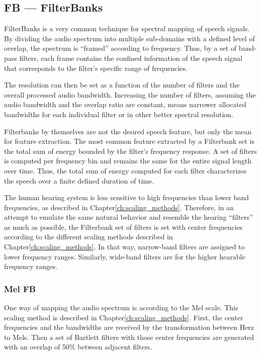 \subsection{FB --- FilterBanks}
FilterBanks is a very common technique
for spectral mapping of speech signals.
By dividing the audio spectrum into multiple 
sub-domains with a defined level of overlap, 
the spectrum is 
``framed'' according to frequency. 
Thus, by a set of band-pass filters,
each frame contains the confined 
information of the speech signal 
that corresponds to the filter's specific 
range of frequencies.

The resolution can then be set as a function of
the number of filters and the overall processed audio bandwidth.
Increasing the number of filters, assuming the 
audio bandwidth and the overlap ratio are constant, means
narrower allocated bandwidths for each individual filter
or in other better spectral resolution.

Filterbanks by themselves are not the desired speech feature,
but only the mean for feature extraction. 
The most common feature extracted by a Filterbank set
is the total sum of energy bounded by the filter's frequency response.
A set of filters is computed per 
frequency bin and remains the same for 
the entire signal length over time.
Thus, the total sum of energy computed for 
each filter characterizes the 
speech over a finite defined duration of time.

The human hearing system is less sensitive to high frequencies
than lower band frequencies, as described in Chapter\;\ref{ch:scaling_methods}.
Therefore, in an attempt to emulate the same natural behavior and
resemble the hearing ``filters'' as much as possible, 
the Filterbank set of filters is set with center frequencies
according to the different scaling 
methods described in Chapter\;\ref{ch:scaling_methods}.
In that way, narrow-band filters are assigned to 
lower frequency ranges. 
Similarly, wide-band filters are for 
the higher hearable frequency ranges.

\subsubsection{Mel FB}
One way of mapping the audio spectrum is according to the Mel
scale. This scaling method is described in Chapter\;\ref{ch:scaling_methods}.
First, the center frequencies and the bandwidths are received by the transformation
between Herz to Mels. Then a set of Bartlett
filters with those center frequencies are generated
with an overlap of 50\% between adjacent filters. 



